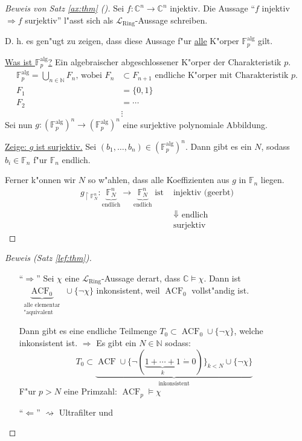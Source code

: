 \documentclass[a4paper,12pt,numbers=noenddot,parskip=full]{scrartcl}
\newcommand{\setN}{\mathbb{N}}
\newcommand{\setC}{\mathbb{C}}
\newcommand{\scrL}{\mathcal{L}}
\DeclareMathOperator{\acf}{ACF}
\theoremstyle{dotless}
\begin{document}
\begin{proof}[Beweis von Satz \ref{ax:thm} ()]
	Sei $f: \setC^n \longrightarrow \setC^n$ injektiv. Die Aussage "`$f$ injektiv $\Rightarrow f$ surjektiv"' l"asst sich als $\scrL_\text{Ring}$-Aussage schreiben.
	
	D. h. es gen"ugt zu zeigen, dass diese Aussage f"ur \underline{alle} K"orper $\mathbb{F}^\text{alg}_p$ gilt.
	
	\underline{Was ist $\mathbb{F}^\text{alg}_p$?} Ein algebraischer abgeschlossener K"orper der Charakteristik $p$.
	\begin{align*}
		\mathbb{F}^\text{alg}_p = \bigcup\limits_{n \in \setN} F_n \text{, wobei } F_n &\subset F_{n+1} \text{ endliche K"orper mit Charakteristik } p.\\
		F_1&=\{0,1\}\\
		F_2&= \cdots\\
		&\vdots
	\end{align*}
	Sei nun $g: (\mathbb{F}^\text{alg}_p)^n \longrightarrow (\mathbb{F}^\text{alg}_p)^n$ eine surjektive polynomiale Abbildung.
	
	\underline{Zeige: $g$ ist surjektiv.} Sei $(b_1, \dots, b_n) \in (\mathbb{F}^\text{alg}_p)^n$. Dann gibt es ein $N$, sodass $b_i \in \mathbb{F}_n$ f"ur $\mathbb{F}_n$ endlich.
	
	Ferner k"onnen wir $N$ so w"ahlen, dass alle Koeffizienten aus $g$ in $\mathbb{F}_n$ liegen.
	\begin{align*}
		g_{\upharpoonright \mathbb{F}^n_N}: \underbrace{\mathbb{F}^n_N}_{\text{endlich}} \longrightarrow \underbrace{\mathbb{F}^n_N}_{\text{endlich}} \text{ ist }&\text{injektiv (geerbt)}\\
		&\Downarrow \text{ endlich} \\
		&\text{surjektiv}
	\end{align*}
\end{proof}

\begin{proof}[Beweis  (Satz \ref{lef:thm})]
	\begin{itemize}
		\item["`$\Rightarrow$"'] Sei $\chi$ eine $\scrL_\text{Ring}$-Aussage derart, dass $\setC \models \chi$. Dann ist $\underbrace{\acf_0}_{\substack{\text{alle elementar}\\ \text{"aquivalent}}} \cup \{\lnot \chi \}$ inkonsistent, weil $\acf_0$ vollst"andig ist.
		
		Dann gibt es eine endliche Teilmenge $T_0 \subset \acf_0 \cup \{\lnot \chi \}$, welche inkonsistent ist. $\Rightarrow$ Es gibt ein $N \in \setN$ sodass:
		\begin{equation*}
			T_0 \subset \underbrace{\acf \cup \{\lnot (\underbrace{1+ \cdots +1}_k \dot= 0) \}_{k<N} \cup \{\lnot \chi \}}_{\text{inkonsistent}}
		\end{equation*}
		F"ur $p>N$ eine Primzahl: $\acf_p \models \chi$
		
		\item["`$\Leftarrow$"'] $\rightsquigarrow$ Ultrafilter und 
	\end{itemize}
\end{proof}
		
\end{document}
